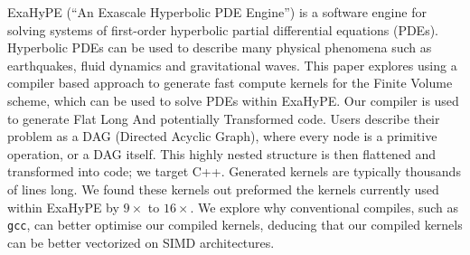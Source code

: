 ExaHyPE (``An Exascale Hyperbolic PDE Engine'') is a software engine for solving systems of first-order hyperbolic partial differential equations (PDEs).
Hyperbolic PDEs can be used to describe many physical phenomena such as earthquakes, fluid dynamics and gravitational waves.
This paper explores using a compiler based approach to generate fast compute kernels for the Finite Volume scheme, which can be used to solve PDEs within ExaHyPE.
Our compiler \phlat is used to generate Flat Long And potentially Transformed code.
Users describe their problem as a DAG (Directed Acyclic Graph), where every node is a primitive operation, or a DAG itself.
This highly nested structure is then flattened and transformed into code; we target C++.
Generated kernels are typically thousands of lines long.
We found these kernels out preformed the kernels currently used within ExaHyPE by $9\times$ to $16\times$.
We explore why conventional compiles, such as \texttt{gcc}, can better optimise our compiled kernels, deducing that our compiled kernels can be better vectorized on SIMD architectures. 
